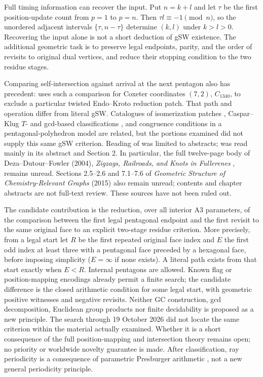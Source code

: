\documentclass[11pt]{amsart}
\begin{document}
Full timing information can recover the input. Put $n=k+l$ and let
$\tau$ be the first position-update count from $p=1$ to $p=n$.
Then $\tau l\equiv-1\pmod n$, so the unordered adjacent intervals
$\{\tau,n-\tau\}$ determine $(k,l)$ under $k>l>0$.
Recovering the input alone is not a short deduction of gSW existence.
The additional geometric task is to preserve legal endpoints, parity,
and the order of revisits to original dual vertices, and reduce their
stopping condition to the two residue stages.

Comparing self-intersection against arrival at the next pentagon also
has precedent: \cite[Section 6, Fig.~5]{Growing} uses such a comparison
for Coxeter coordinates $(7,2)$, $C_{1340}$, to exclude a particular
twisted Endo--Kroto reduction patch. That path and operation differ from
literal gSW. Catalogues of isomerization patches \cite{Patches},
Caspar--Klug $T$- and gcd-based classifications \cite{Capsids}, and
congruence conditions in a pentagonal-polyhedron model \cite{Pentagonal}
are related, but the portions examined did not supply this same gSW
criterion. Reading of \cite{Patches,Knots} was limited to abstracts;
\cite{Pentagonal} was read mainly in its abstract and Section 2.
In particular, the full twelve-page body of Deza--Dutour--Fowler
(2004), \emph{Zigzags, Railroads, and Knots in Fullerenes}
\cite{Knots}, remains unread. Sections 2.5--2.6 and 7.1--7.6 of
\emph{Geometric Structure of Chemistry-Relevant Graphs} (2015)
also remain unread; contents and chapter abstracts are not full-text
review. These sources have not been ruled out.

The candidate contribution is the reduction, over all interior A3
parameters, of the comparison between the first legal pentagonal
endpoint and the first revisit to the same original face to an explicit
two-stage residue criterion. More precisely, from a legal start let
$R$ be the first repeated original face index and $E$ the first odd
index at least three with a pentagonal face preceded by a hexagonal
face, before imposing simplicity ($E=\infty$ if none exists). A literal path exists from that
start exactly when $E<R$. Internal pentagons are allowed. Known flag
or position-mapping encodings already permit a finite search; the
candidate difference is the closed arithmetic condition for some
legal start, with geometric positive witnesses and negative revisits.
Neither GC construction, gcd decomposition, Euclidean group products
nor finite decidability is proposed as a new principle. The search
through 19 October 2026 did not locate the same criterion within the
material actually examined. Whether it is a
short consequence of the full position-mapping and intersection theory
remains open; no priority or worldwide novelty guarantee is made.
After classification, ray periodicity is a consequence of parametric
Presburger arithmetic \cite[Theorem 1.15, Property 1]{BGW}, not a new
general periodicity principle.
\end{document}
